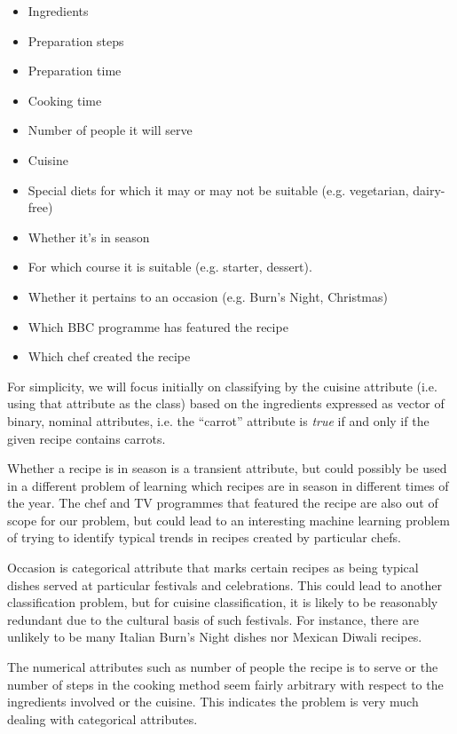 \documentclass[11pt,a4paper]{article}
\begin{document}
\begin{itemize}
\item Ingredients
\item Preparation steps
\item Preparation time
\item Cooking time
\item Number of people it will serve
\item Cuisine
\item Special diets for which it may or may not be suitable
  (e.g. vegetarian, dairy-free)
\item Whether it's in season
\item For which course it is suitable (e.g. starter, dessert).
\item Whether it pertains to an occasion (e.g. Burn's Night, Christmas)
\item Which BBC programme has featured the recipe
\item Which chef created the recipe
\end{itemize}

For simplicity, we will focus initially on classifying by the cuisine attribute
(i.e. using that attribute as the class) based on the ingredients expressed as
vector of binary, nominal attributes, i.e. the ``carrot'' attribute is
\emph{true} if and only if the given recipe contains carrots.

Whether a recipe is in season is a transient attribute, but could possibly be
used in a different problem of learning which recipes are in season in different
times of the year. The chef and TV programmes that featured the recipe are
also out of scope for our problem, but could lead to an interesting machine
learning problem of trying to identify typical trends in recipes created by
particular chefs.

Occasion is categorical attribute that marks certain recipes as being typical
dishes served at particular festivals and celebrations. This could lead to
another classification problem, but for cuisine classification, it is likely to
be reasonably redundant due to the cultural basis of such festivals. For
instance, there are unlikely to be many Italian Burn's Night dishes nor Mexican
Diwali recipes.

The numerical attributes such as number of people the recipe is to serve or the
number of steps in the cooking method seem fairly arbitrary with respect to the
ingredients involved or the cuisine. This indicates the problem is very much
dealing with categorical attributes.
\end{document}

